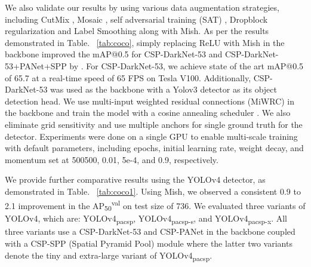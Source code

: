 \documentclass{bmvc2k}
\begin{document}
We also validate our results by using various data augmentation strategies, including CutMix \cite{yun2019cutmix} , Mosaic \cite{bochkovskiy2020yolov4}, self adversarial training (SAT) \cite{bochkovskiy2020yolov4}, Dropblock regularization \cite{ghiasi2018dropblock} and Label Smoothing \cite{muller2019does} along with Mish. As per the results demonstrated in Table. ~\ref{tab:coco}, simply replacing ReLU with Mish in the backbone improved the mAP@0.5 for CSP-DarkNet-53 and CSP-DarkNet-53+PANet+SPP by . For CSP-DarkNet-53, we achieve state of the art mAP@0.5 of 65.7 at a real-time speed of 65 FPS on Tesla V100. Additionally, CSP-DarkNet-53 was used as the backbone with a Yolov3 detector \cite{redmon2018yolov3} as its object detection head. We use multi-input weighted residual connections (MiWRC) \cite{tan2019efficientdet} in the backbone and train the model with a cosine annealing scheduler \cite{loshchilov2016sgdr}. We also eliminate grid sensitivity and use multiple anchors for single ground truth for the detector. Experiments were done on a single GPU to enable multi-scale training with default parameters, including epochs, initial learning rate, weight decay, and momentum set at 500500, 0.01, 5e-4, and 0.9, respectively. 

\begin{table}[h]
	\begin{center}
	\end{center}
	\caption{Comparison between ReLU and Mish activation functions on object detection on MS-COCO dataset.}
	\label{tab:coco}
\end{table}

We provide further comparative results using the YOLOv4 \cite{bochkovskiy2020yolov4} detector, as demonstrated in Table. ~\ref{tab:coco1}. Using Mish, we observed a consistent 0.9 to 2.1 improvement in the AP\textsubscript{50}\textsuperscript{val} on test size of 736. We evaluated three variants of YOLOv4, which are: YOLOv4\textsubscript{pacsp}, YOLOv4\textsubscript{pacsp-s}, and YOLOv4\textsubscript{pacsp-x}. All three variants use a CSP-DarkNet-53 \cite{wang2019cspnet} and CSP-PANet in the backbone coupled with a CSP-SPP \cite{he2015spatial} (Spatial Pyramid Pool) module where the latter two variants denote the tiny and extra-large variant of YOLOv4\textsubscript{pacsp}.
\end{document}
